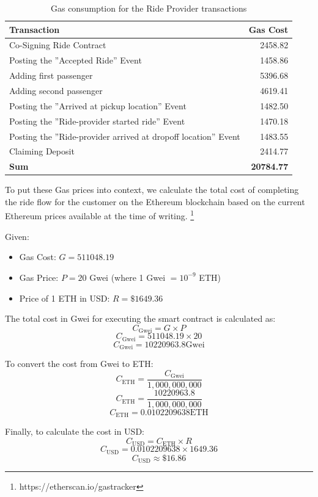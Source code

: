 \begin{table}[H]
\centering
\begin{tabular}{|l|r|}
\hline
\textbf{Transaction} & \textbf{Gas Cost} \\
\hline
Co-Signing Ride Contract & 2458.82 \\
\hline
Posting the ''Accepted Ride'' Event & 1458.86 \\
\hline
Adding first passenger  & 5396.68 \\
\hline
Adding second passenger & 4619.41 \\
\hline
Posting the ''Arrived at pickup location'' Event & 1482.50 \\
\hline
Posting the ''Ride-provider started ride'' Event & 1470.18 \\
\hline
Posting the ''Ride-provider arrived at dropoff location'' Event & 1483.55 \\
\hline
Claiming Deposit & 2414.77 \\
\hline
\hline
\textbf{Sum}  & \textbf{20784.77} \\
\hline
\end{tabular}
\caption{Gas consumption for the Ride Provider transactions}
\label{tab:gasRideProvider}
\end{table}

To put these Gas prices into context, we calculate the total cost of completing the ride flow for the customer on the Ethereum blockchain based on the current Ethereum prices available at the time of writing. \footnote{https://etherscan.io/gastracker}

Given:
\begin{itemize}
    \item Gas Cost: \( G = 511048.19 \)
    \item Gas Price: \( P = 20 \) Gwei (where 1 Gwei \( = 10^{-9} \) ETH)
    \item Price of 1 ETH in USD: \( R = \$1649.36 \)
\end{itemize}

The total cost in Gwei for executing the smart contract is calculated as:
\[ C_{\text{Gwei}} = G \times P \]
\[ C_{\text{Gwei}} = 511048.19 \times 20 \]
\[ C_{\text{Gwei}} = 10220963.8 \text{Gwei} \]

To convert the cost from Gwei to ETH:
\[ C_{\text{ETH}} = \frac{C_{\text{Gwei}}}{1,000,000,000} \]
\[ C_{\text{ETH}} = \frac{10220963.8}{1,000,000,000} \]
\[ C_{\text{ETH}} = 0.0102209638 \text{ETH} \] 

Finally, to calculate the cost in USD:
\[ C_{\text{USD}} = C_{\text{ETH}} \times R \]
\[ C_{\text{USD}} = 0.0102209638 \times 1649.36 \]
\[ C_{\text{USD}} \approx \$16.86 \]

